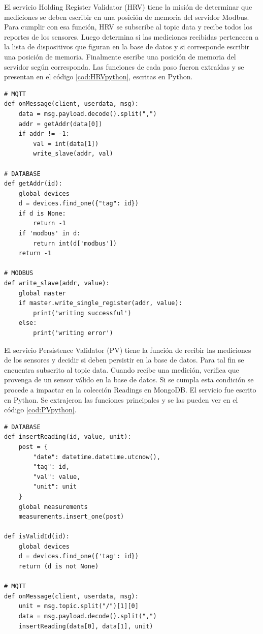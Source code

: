 El servicio Holding Register Validator (HRV) tiene la misión de determinar que mediciones se deben escribir en una posición de memoria del servidor Modbus.
Para cumplir con esa función, HRV se subscribe al topic data y recibe todos los reportes de los sensores.
Luego determina si las mediciones recibidas pertenecen a la lista de dispositivos que figuran en la base de datos y si corresponde escribir una posición de memoria.
Finalmente escribe una posición de memoria del servidor según corresponda.
Las funciones de cada paso fueron extraídas y se presentan en el código \ref{cod:HRVpython}, escritas en Python.

\begin{lstlisting}[label=cod:HRVpython,caption=Funciones principales del servicio HRV]
# MQTT
def onMessage(client, userdata, msg):
    data = msg.payload.decode().split(",")
    addr = getAddr(data[0])
    if addr != -1:
        val = int(data[1])
        write_slave(addr, val)
        
# DATABASE
def getAddr(id):
    global devices
    d = devices.find_one({"tag": id})
    if d is None:
        return -1
    if 'modbus' in d:
        return int(d['modbus'])
    return -1

# MODBUS
def write_slave(addr, value):
    global master
    if master.write_single_register(addr, value):
        print('writing successful')
    else:
        print('writing error')
\end{lstlisting}

El servicio Persistence Validator (PV) tiene la función de recibir las mediciones de los sensores y decidir si deben persistir en la base de datos.
Para tal fin se encuentra subscrito al topic data.
Cuando recibe una medición, verifica que provenga de un sensor válido en la base de datos.
Si se cumpla esta condición se procede a impactar en la colección Readings en MongoDB.
El servicio fue escrito en Python.
Se extrajeron las funciones principales y se las pueden ver en el código \ref{cod:PVpython}.

\begin{lstlisting}[label=cod:PVpython,caption=Funciones principales del servicio PV]
# DATABASE
def insertReading(id, value, unit):
    post = {
        "date": datetime.datetime.utcnow(),
        "tag": id,
        "val": value,
        "unit": unit
    }
    global measurements
    measurements.insert_one(post)

def isValidId(id):
    global devices
    d = devices.find_one({'tag': id})
    return (d is not None)
    
# MQTT
def onMessage(client, userdata, msg):
    unit = msg.topic.split("/")[1][0]
    data = msg.payload.decode().split(",")
    insertReading(data[0], data[1], unit)    
\end{lstlisting}
	
